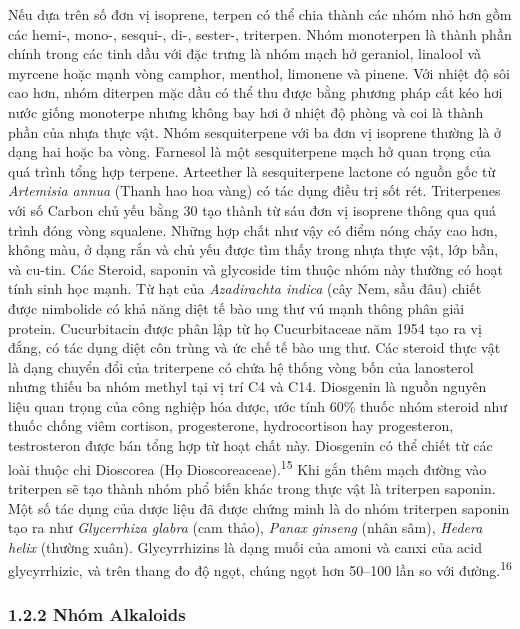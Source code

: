 \documentclass[
  letterpaper,
  DIV=11,
  numbers=noendperiod]{scrartcl}
\begin{document}
Nếu dựa trên số đơn vị isoprene, terpen có thể chia thành các nhóm nhỏ
hơn gồm các hemi-, mono-, sesqui-, di-, sester-, triterpen. Nhóm
monoterpen là thành phần chính trong các tinh dầu với đặc trưng là nhóm
mạch hở geraniol, linalool và myrcene hoặc mạnh vòng camphor, menthol,
limonene và pinene. Với nhiệt độ sôi cao hơn, nhóm diterpen mặc dầu có
thể thu được bằng phương pháp cất kéo hơi nước giống monoterpe nhưng
không bay hơi ở nhiệt độ phòng và coi là thành phần của nhựa thực vật.
Nhóm sesquiterpene với ba đơn vị isoprene thường là ở dạng hai hoặc ba
vòng. Farnesol là một sesquiterpene mạch hở quan trọng của quá trình
tổng hợp terpene. Arteether là sesquiterpene lactone có nguồn gốc từ
\emph{Artemisia annua} (Thanh hao hoa vàng) có tác dụng điều trị sốt
rét. Triterpenes với số Carbon chủ yếu bằng 30 tạo thành từ sáu đơn vị
isoprene thông qua quá trình đóng vòng squalene. Những hợp chất như vậy
có điểm nóng chảy cao hơn, không màu, ở dạng rắn và chủ yếu được tìm
thấy trong nhựa thực vật, lớp bần, và cu-tin. Các Steroid, saponin và
glycoside tim thuộc nhóm này thường có hoạt tính sinh học mạnh. Từ hạt
của \emph{Azadirachta indica} (cây Nem, sầu đâu) chiết được nimbolide có
khả năng diệt tế bào ung thư vú mạnh thông phân giải protein.
Cucurbitacin được phân lập từ họ Cucurbitaceae năm 1954 tạo ra vị đắng,
có tác dụng diệt côn trùng và ức chế tế bào ung thư. Các steroid thực
vật là dạng chuyển đổi của triterpene có chứa hệ thống vòng bốn của
lanosterol nhưng thiếu ba nhóm methyl tại vị trí C4 và C14. Diosgenin là
nguồn nguyên liệu quan trọng của công nghiệp hóa dược, ước tính 60\%
thuốc nhóm steroid như thuốc chống viêm cortison, progesterone,
hydrocortison hay progesteron, testrosteron được bán tổng hợp từ hoạt
chất này. Diosgenin có thể chiết từ các loài thuộc chi Dioscorea (Họ
Dioscoreaceae).\textsuperscript{15} Khi gắn thêm mạch đường vào
triterpen sẽ tạo thành nhóm phổ biến khác trong thực vật là triterpen
saponin. Một số tác dụng của dược liệu đã được chứng minh là do nhóm
triterpen saponin tạo ra như \emph{Glycerrhiza glabra} (cam thảo),
\emph{Panax ginseng} (nhân sâm), \emph{Hedera helix} (thường xuân).
Glycyrrhizins là dạng muối của amoni và canxi của acid glycyrrhizic, và
trên thang đo độ ngọt, chúng ngọt hơn 50--100 lần so với
đường.\textsuperscript{16}

\subsubsection{1.2.2 Nhóm Alkaloids}\label{nhuxf3m-alkaloids}
\end{document}
